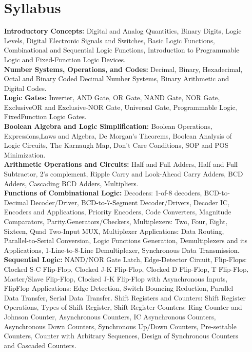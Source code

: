 \documentclass[a4aper,12pt]{report}
\begin{document}
    \chapter*{Syllabus}
    \thispagestyle{empty}
    \vspace*{-2.7cm}
   \textbf{Introductory Concepts:} Digital and Analog Quantities, Binary Digits, Logic Levels, Digital Electronic Signals and Switches, Basic Logic Functions, Combinational and Sequential Logic Functions, Introduction to Programmable Logic and Fixed-Function Logic Devices. \\ [5pt]
   \textbf{Number Systems, Operations, and Codes:} Decimal, Binary, Hexadecimal, Octal and Binary Coded Decimal Number Systems, Binary Arithmetic and Digital Codes. \\ [5pt]
   \textbf{Logic Gates:} Inverter, AND Gate, OR Gate, NAND Gate, NOR Gate, ExclusiveOR and Exclusive-NOR Gate, Universal Gate, Programmable Logic, FixedFunction Logic Gates. \\ [5pt]
   \textbf{Boolean Algebra and Logic Simplification:} Boolean Operations, Expressions,Laws and Algebra, De Morgan’s Theorems, Boolean Analysis of Logic Circuits, The Karnaugh Map, Don’t Care Conditions, SOP and POS Minimization. \\[5pt]
   \textbf{Arithmetic Operations and Circuits:} Half and Full Adders, Half and Full Subtractor, 2’s complement, Ripple Carry and Look-Ahead Carry Adders, BCD Adders, Cascading BCD Adders, Multipliers. \\ [5pt]
   \textbf{Functions of Combinational Logic:} Decoders: 1-of-8 decoders, BCD-to-Decimal Decoder/Driver, BCD-to-7-Segment Decoder/Drivers, Decoder IC, Encoders and Applications, Priority Encoders, Code Converters, Magnitude Comparators, Parity.Generators/Checkers, Multiplexers: Two, Four, Eight, Sixteen, Quad Two-Input MUX, Multiplexer Applications: Data Routing, Parallel-to-Serial Conversion, Logic Functions Generation, Demultiplexers and its Applications, 1-Line-to-8-Line Demultiplexer, Synchronous Data Transmission. \\ [5pt]
   \textbf{Sequential Logic:} NAND/NOR Gate Latch, Edge-Detector Circuit, Flip-Flops: Clocked S-C Flip-Flop, Clocked J-K Flip-Flop, Clocked D Flip-Flop, T Flip-Flop, Master/Slave Flip-Flop, Clocked J-K Flip-Flop with Asynchronous Inputs, FlipFlop Applications: Edge Detection, Switch Bouncing Reduction, Parallel Data Transfer, Serial Data Transfer. Shift Registers and Counters: Shift Register Operations, Types of Shift Register, Shift Register Counters: Ring Counter and Johnson Counter, Asynchronous Counters, IC Asynchronous Counters, Asynchronous Down Counters, Synchronous Up/Down Counters, Pre-settable Counters, Counter with Arbitrary Sequences, Design of Synchronous Counters and Cascaded Counters. \\ [5pt] 
\end{document}
